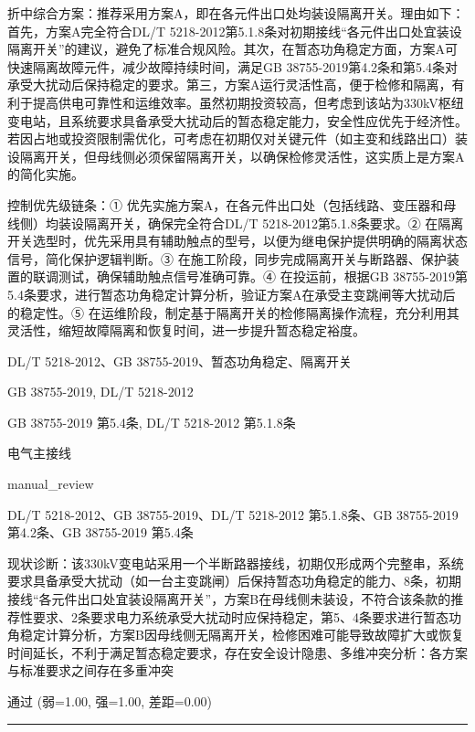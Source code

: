 \documentclass[11pt,a4paper]{ctexart}
\begin{document}
\begin{description}[leftmargin=1.5em,style=nextline,font=\normalfont]
折中综合方案：推荐采用方案A，即在各元件出口处均装设隔离开关。理由如下：首先，方案A完全符合DL/T 5218-2012第5.1.8条对初期接线“各元件出口处宜装设隔离开关”的建议，避免了标准合规风险。其次，在暂态功角稳定方面，方案A可快速隔离故障元件，减少故障持续时间，满足GB 38755-2019第4.2条和第5.4条对承受大扰动后保持稳定的要求。第三，方案A运行灵活性高，便于检修和隔离，有利于提高供电可靠性和运维效率。虽然初期投资较高，但考虑到该站为330kV枢纽变电站，且系统要求具备承受大扰动后的暂态稳定能力，安全性应优先于经济性。若因占地或投资限制需优化，可考虑在初期仅对关键元件（如主变和线路出口）装设隔离开关，但母线侧必须保留隔离开关，以确保检修灵活性，这实质上是方案A的简化实施。

控制优先级链条：① 优先实施方案A，在各元件出口处（包括线路、变压器和母线侧）均装设隔离开关，确保完全符合DL/T 5218-2012第5.1.8条要求。② 在隔离开关选型时，优先采用具有辅助触点的型号，以便为继电保护提供明确的隔离状态信号，简化保护逻辑判断。③ 在施工阶段，同步完成隔离开关与断路器、保护装置的联调测试，确保辅助触点信号准确可靠。④ 在投运前，根据GB 38755-2019第5.4条要求，进行暂态功角稳定计算分析，验证方案A在承受主变跳闸等大扰动后的稳定性。⑤ 在运维阶段，制定基于隔离开关的检修隔离操作流程，充分利用其灵活性，缩短故障隔离和恢复时间，进一步提升暂态稳定裕度。
  \item[KW:] DL/T 5218-2012、GB 38755-2019、暂态功角稳定、隔离开关
  \item[标准:] GB 38755-2019, DL/T 5218-2012
  \item[条款溯源:] GB 38755-2019 第5.4条, DL/T 5218-2012 第5.1.8条
  \item[主题:] 电气主接线
  \item[评分方式:] manual\_review
  \item[Rubric条款:] DL/T 5218-2012、GB 38755-2019、DL/T 5218-2012 第5.1.8条、GB 38755-2019 第4.2条、GB 38755-2019 第5.4条
  \item[Rubric判据:] 现状诊断：该330kV变电站采用一个半断路器接线，初期仅形成两个完整串，系统要求具备承受大扰动（如一台主变跳闸）后保持暂态功角稳定的能力、8条，初期接线“各元件出口处宜装设隔离开关”，方案B在母线侧未装设，不符合该条款的推荐性要求、2条要求电力系统承受大扰动时应保持稳定，第5、4条要求进行暂态功角稳定计算分析，方案B因母线侧无隔离开关，检修困难可能导致故障扩大或恢复时间延长，不利于满足暂态稳定要求，存在安全设计隐患、多维冲突分析：各方案与标准要求之间存在多重冲突
  \item[LJ判定:] 通过 (弱=1.00, 强=1.00, 差距=0.00)
\end{description}
\vspace{4pt}
\hrule
\vspace{6pt}
\end{document}
